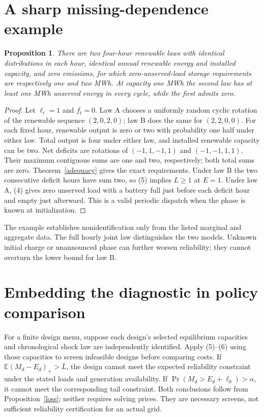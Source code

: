 \documentclass[11pt]{article}
\newtheorem{proposition}[theorem]{Proposition}
\newcommand{\E}{\mathbb E}
\begin{document}
\section{A sharp missing-dependence example}
\begin{proposition}\label{dependence}
There are two four-hour renewable laws with identical distributions in
each hour, identical annual renewable energy and installed capacity, and
zero emissions, for which zero-unserved-load storage requirements are
respectively one and two MWh. At capacity one MWh the second law has at
least one MWh unserved energy in every cycle, while the first admits zero.
\end{proposition}
\begin{proof}
Let $\ell_t=1$ and $f_t=0$. Law A chooses a uniformly random cyclic
rotation of the renewable sequence $(2,0,2,0)$; law B does the same for
$(2,2,0,0)$. For each fixed hour, renewable output is zero or two with
probability one half under either law. Total output is four under either
law, and installed renewable capacity can be two. Net deficits are rotations
of $(-1,1,-1,1)$ and $(-1,-1,1,1)$. Their maximum contiguous sums are one
and two, respectively; both total sums are zero. Theorem~\ref{adequacy}
gives the exact requirements. Under law B the two consecutive deficit
hours have sum two, so (5) implies $L\geq1$ at $E=1$. Under law A,
(4) gives zero unserved load with a battery full just before each deficit
hour and empty just afterward. This is a valid periodic dispatch when
the phase is known at initialization.
\end{proof}
The example establishes nonidentification only from the listed marginal
and aggregate data. The full hourly joint law distinguishes the two models.
Unknown initial charge or unannounced phase can further worsen reliability;
they cannot overturn the lower bound for law B.

\section{Embedding the diagnostic in policy comparison}
For a finite design menu, suppose each design's selected equilibrium
capacities and chronological shock law are independently identified. Apply
(5)--(6) using those capacities to screen infeasible designs before comparing
costs. If $\E(M_d-E_d)_+>\bar L$, the design cannot meet the expected
reliability constraint under the stated loads and generation availability.
If $\Pr(M_d>E_d+\ell_0)>\alpha$, it cannot meet the corresponding tail
constraint. Both conclusions follow from Proposition~\ref{loss}; neither
requires solving prices. They are necessary screens, not sufficient
reliability certification for an actual grid.
\end{document}
